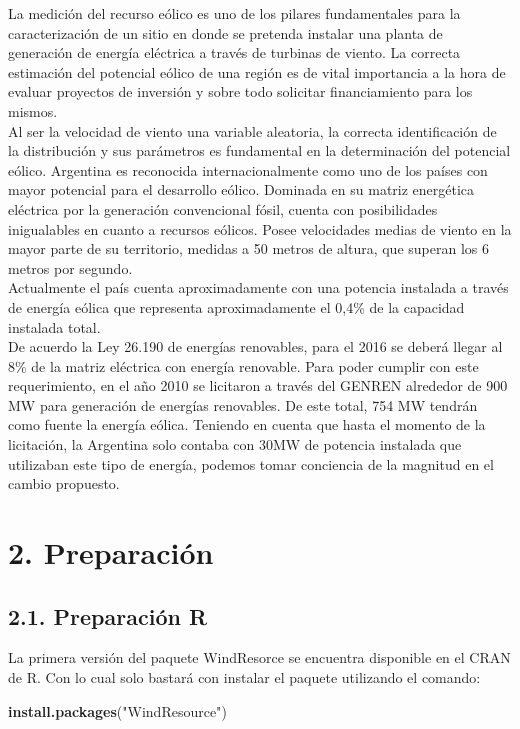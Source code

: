 \documentclass[]{article}
\newenvironment{Shaded}{\begin{snugshade}}{\end{snugshade}}
\newcommand{\KeywordTok}[1]{\textcolor[rgb]{0.13,0.29,0.53}{\textbf{{#1}}}}
\newcommand{\StringTok}[1]{\textcolor[rgb]{0.31,0.60,0.02}{{#1}}}
\newcommand{\NormalTok}[1]{{#1}}
\begin{document}
La medición del recurso eólico es uno de los pilares fundamentales para
la caracterización de un sitio en donde se pretenda instalar una planta
de generación de energía eléctrica a través de turbinas de viento. La
correcta estimación del potencial eólico de una región es de vital
importancia a la hora de evaluar proyectos de inversión y sobre todo
solicitar financiamiento para los mismos.\\Al ser la velocidad de viento
una variable aleatoria, la correcta identificación de la distribución y
sus parámetros es fundamental en la determinación del potencial eólico.
Argentina es reconocida internacionalmente como uno de los países con
mayor potencial para el desarrollo eólico. Dominada en su matriz
energética eléctrica por la generación convencional fósil, cuenta con
posibilidades inigualables en cuanto a recursos eólicos. Posee
velocidades medias de viento en la mayor parte de su territorio, medidas
a 50 metros de altura, que superan los 6 metros por
segundo.\\Actualmente el país cuenta aproximadamente con una potencia
instalada a través de energía eólica que representa aproximadamente el
0,4\% de la capacidad instalada total.\\De acuerdo la Ley 26.190 de
energías renovables, para el 2016 se deberá llegar al 8\% de la matriz
eléctrica con energía renovable. Para poder cumplir con este
requerimiento, en el año 2010 se licitaron a través del GENREN alrededor
de 900 MW para generación de energías renovables. De este total, 754 MW
tendrán como fuente la energía eólica. Teniendo en cuenta que hasta el
momento de la licitación, la Argentina solo contaba con 30MW de potencia
instalada que utilizaban este tipo de energía, podemos tomar conciencia
de la magnitud en el cambio propuesto.

\section{2. Preparación}\label{preparacion}

\subsection{2.1. Preparación R}\label{preparacion-r}

La primera versión del paquete WindResorce se encuentra disponible en el
CRAN de R. Con lo cual solo bastará con instalar el paquete utilizando
el comando:

\begin{Shaded}
\begin{Highlighting}[]
\KeywordTok{install.packages}\NormalTok{(}\StringTok{"WindResource"}\NormalTok{)}
\end{Highlighting}
\end{Shaded}
\end{document}

